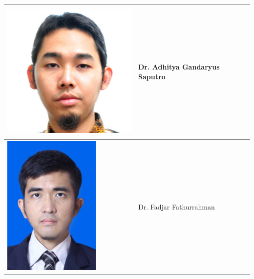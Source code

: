 \documentclass[a0,landscape]{a0poster}
\begin{document}
\begin{multicols}{3}
\begin{tcolorbox}[
  colback=blue!5,
  colframe=green!40!black,
  title=Anggota]
{\begin{tabular}{
|>{\centering\arraybackslash}m{8cm}
|>{\centering\arraybackslash}m{25cm}|}
\includegraphics[height=7cm]{AdhityaGandaryusSaputro.png} &
Dr. Adhitya Gandaryus Saputro \\
\hline
\includegraphics[height=7cm]{FadjarFathurrahman.png} &
Dr. Fadjar Fathurrahman \\
\hline
\end{tabular}
\par
}
\end{tcolorbox}


\end{multicols}
\end{document}
